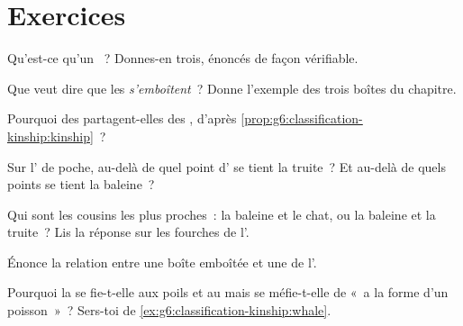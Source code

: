 \section{Exercices}

\begin{exercise}[$\star$]\label{exo:g6:classification-kinship:1}
Qu'est-ce qu'un ~? Donnes-en trois, énoncés de façon
vérifiable.
\end{exercise}

\begin{exercise}[$\star$]\label{exo:g6:classification-kinship:2}
Que veut dire que les  \emph{s'emboîtent}~? Donne l'exemple
des trois boîtes du chapitre.
\end{exercise}

\begin{exercise}[$\star$]\label{exo:g6:classification-kinship:3}
Pourquoi des  partagent-elles des , d'après
\cref{prop:g6:classification-kinship:kinship}~?
\end{exercise}

\begin{exercise}[$\star$]\label{exo:g6:classification-kinship:4}
Sur l' de poche, au-delà de quel point d' se tient la
truite~? Et au-delà de quels points se tient la baleine~?
\end{exercise}

\begin{exercise}[$\star$]\label{exo:g6:classification-kinship:5}
Qui sont les cousins les plus proches~: la baleine et le chat, ou la
baleine et la truite~? Lis la réponse sur les fourches de l'.
\end{exercise}

\begin{exercise}[$\star$]\label{exo:g6:classification-kinship:6}
Énonce la relation entre une boîte emboîtée et une  de
l'.
\end{exercise}

\begin{exercise}[$\star\star$]\label{exo:g6:classification-kinship:7}
Pourquoi la  se fie-t-elle aux poils et au  mais
se méfie-t-elle de «~a la forme d'un poisson~»~? Sers-toi de
\cref{ex:g6:classification-kinship:whale}.
\end{exercise}

